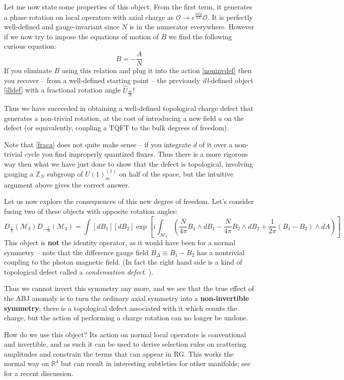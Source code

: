 \documentclass[aps,preprint,nofootinbib,preprintnumbers,eqsecnum,superscriptaddress]{revtex4}
\newcommand{\be}{\begin{equation}}
\newcommand{\ee}{\end{equation}}
\def\le{\left}
\def\ri{\right}
\newcommand\sM{{\ensuremath{{\mathcal M}}}}
\newcommand\sO{{\ensuremath{{\mathcal O}}}}
\numberwithin{equation}{section}
\begin{document}
Let me now state some properties of this object. From the first term, it generates a phase rotation on local operators with axial charge as $\sO \to e^{\frac{2\pi i q}{2N}} \sO$. It is perfectly well-defined and gauge-invariant since $N$ is in the numerator everywhere. However if we now try to impose the equations of motion of $B$ we find the following curious equation:
\be
B = -\frac{A}{N} \label{fraca} 
\ee
If you eliminate $B$ using this relation and plug it into the action \eqref{noninvdef} then you recover -- from a well-defined starting point -- the previously {\it ill}-defined object \eqref{illdef} with a fractional rotation angle $\hat{U}_{\frac{2\pi}{N}}$! 

Thus we have succeeded in obtaining a well-defined topological charge defect that generates a non-trivial rotation, at the cost of introducing a new field $a$ on the defect (or equivalently, coupling a TQFT to the bulk degrees of freedom). 

Note that \eqref{fraca} does not quite make sense -- if you integrate $d$ of it over a non-trivial cycle you find improperly quantized fluxes. Thus there is a more rigorous way then what we have just done to show that the defect is topological, involving gauging a $\mathbb{Z}_N$ subgroup of $U(1)_m^{(1)}$ on half of the space, but the intuitive argument above gives the correct answer. 

Let us now explore the consequences of this new degree of freedom. Let's consider fusing two of these objects with opposite rotation angles:
\be
D_{\frac{1}{N}}(\sM_3) D_{-\frac{1}{N}}(\sM_3) = \int [dB_1] [dB_2] \exp\le[i\int_{\sM_3}\le( \frac{N}{4\pi} B_1 \wedge dB_1 - \frac{N}{4\pi} B_2 \wedge dB_2 + \frac{1}{2\pi} (B_1-B_2) \wedge dA\ri)\ri]
\ee
This object is {\bf not} the identity operator, as it would have been for a normal symmetry -- note that the difference gauge field $B_{\Delta} \equiv B_1 - B_2$ has a nontrivial coupling to the photon magnetic field. (In fact the right hand side is a kind of topological defect called a {\it condensation defect}.   \cite{Roumpedakis:2022aik,Choi:2022zal}). 

Thus we cannot invert this symmetry any more, and we see that the true effect of the ABJ anomaly is to turn the ordinary axial symmetry into a {\bf non-invertible symmetry}; there is a topological defect associated with it which counts the charge, but the action of performing a charge rotation can no longer be undone. 

How do we use this object? Its action on normal local operators is conventional and invertible, and as such it can be used to derive selection rules on scattering amplitudes and constrain the terms that can appear in RG. This works the normal way on $\mathbb{R}^4$ but can result in interesting subtleties for other manifolds; see \cite{Cherman:2022eml} for a recent discussion. 
\end{document}
